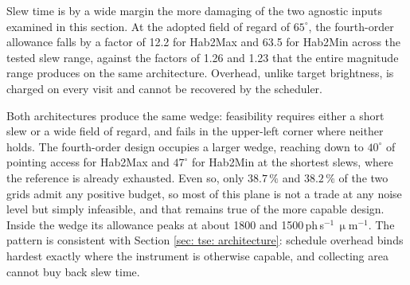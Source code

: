 \documentclass[12pt,a4paper]{article}
\numberwithin{equation}{section}
\numberwithin{figure}{section}
\numberwithin{table}{section}
\begin{document}
Slew time is by a wide margin the more damaging of the two agnostic inputs examined in this section. At the adopted field of regard of $65^\circ$, the fourth-order allowance falls by a factor of 12.2 for Hab2Max and 63.5 for Hab2Min across the tested slew range, against the factors of 1.26 and 1.23 that the entire magnitude range produces on the same architecture. Overhead, unlike target brightness, is charged on every visit and cannot be recovered by the scheduler.

Both architectures produce the same wedge: feasibility requires either a short slew or a wide field of regard, and fails in the upper-left corner where neither holds. The fourth-order design occupies a larger wedge, reaching down to $40^\circ$ of pointing access for Hab2Max and $47^\circ$ for Hab2Min at the shortest slews, where the reference is already exhausted. Even so, only $38.7\,\%$ and $38.2\,\%$ of the two grids admit any positive budget, so most of this plane is not a trade at any noise level but simply infeasible, and that remains true of the more capable design. Inside the wedge its allowance peaks at about 1800 and 1500\,ph\,s$^{-1}\,\upmu$m$^{-1}$. The pattern is consistent with Section \ref{sec: tse: architecture}: schedule overhead binds hardest exactly where the instrument is otherwise capable, and collecting area cannot buy back slew time.
\end{document}
